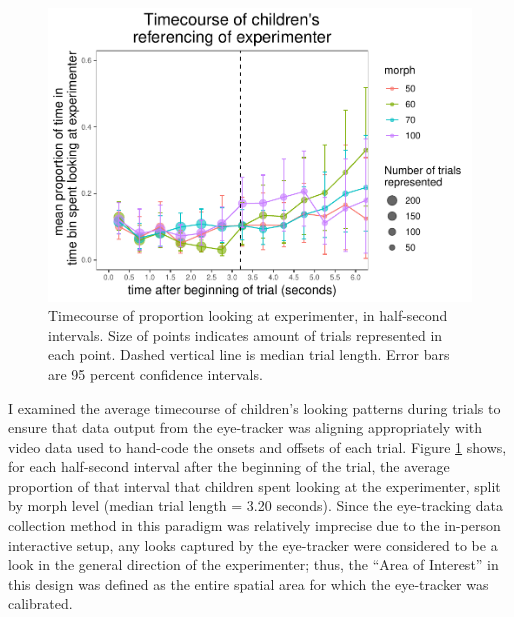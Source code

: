\documentclass[,man,floatsintext]{apa6}
\begin{document}
\begin{figure}
\centering
\includegraphics{soc_ref_category_paper_files/figure-latex/forwardtimecourse-1.pdf}
\caption{\label{fig:forwardtimecourse}Timecourse of proportion looking at experimenter, in half-second intervals. Size of points indicates amount of trials represented in each point. Dashed vertical line is median trial length. Error bars are 95 percent confidence intervals.}
\end{figure}

I examined the average timecourse of children's looking patterns during trials to ensure that data output from the eye-tracker was aligning appropriately with video data used to hand-code the onsets and offsets of each trial. Figure \ref{fig:forwardtimecourse} shows, for each half-second interval after the beginning of the trial, the average proportion of that interval that children spent looking at the experimenter, split by morph level (median trial length = 3.20 seconds). Since the eye-tracking data collection method in this paradigm was relatively imprecise due to the in-person interactive setup, any looks captured by the eye-tracker were considered to be a look in the general direction of the experimenter; thus, the \enquote{Area of Interest} in this design was defined as the entire spatial area for which the eye-tracker was calibrated.
\end{document}
